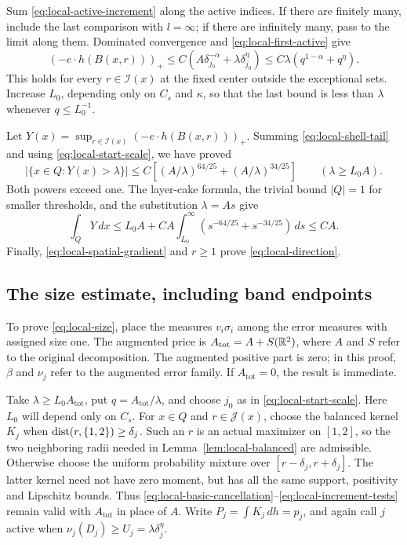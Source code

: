 Sum \eqref{eq:local-active-increment} along the active indices. If
there are finitely many, include the last comparison with $l=\infty$;
if there are infinitely many, pass to the limit along them. Dominated
convergence and \eqref{eq:local-first-active} give
\begin{equation}\label{eq:local-final-projection}
(-e\cdot h(B(x,r)))_+
 \le C\left(A\delta_{j_0}^{-\alpha}
                   +\lambda\delta_{j_0}^\eta\right)
 \le C\lambda\left(q^{1-\alpha}+q^\eta\right).
\end{equation}
This holds for every $r\in\mathcal I(x)$ at the fixed center outside
the exceptional sets. Increase $L_0$, depending only on $C_s$ and
$\kappa$, so that the last bound is less than $\lambda$ whenever
$q\le L_0^{-1}$.

Let $Y(x)=\sup_{r\in\mathcal I(x)}(-e\cdot h(B(x,r)))_+$.
Summing \eqref{eq:local-shell-tail} and using
\eqref{eq:local-start-scale}, we have proved
\begin{equation}\label{eq:local-direction-tail}
|\{x\in Q:Y(x)>\lambda\}|
 \le C\left[
       (A/\lambda)^{64/25}+(A/\lambda)^{34/25}\right]
 \qquad(\lambda\ge L_0A).
\end{equation}
Both powers exceed one. The layer-cake formula, the trivial bound
$|Q|=1$ for smaller thresholds, and the substitution
$\lambda=As$ give
\[
\int_QY\,dx
 \le L_0A+C A\int_{L_0}^{\infty}
                  (s^{-64/25}+s^{-34/25})\,ds\le C A.
\]
Finally, \eqref{eq:local-spatial-gradient} and $r\ge1$ prove
\eqref{eq:local-direction}.

\subsection{The size estimate, including band endpoints}

To prove \eqref{eq:local-size}, place the measures $v_i\sigma_i$
among the error measures with assigned size one. The augmented price is
$A_{\mathrm{tot}}=A+S(\mathbb R^2)$, where $A$ and $S$ refer to the original
decomposition. The augmented positive part is zero; in this proof,
$\beta$ and $\nu_j$ refer to the augmented error family.
If $A_{\mathrm{tot}}=0$, the result is immediate.

Take $\lambda\ge L_0A_{\mathrm{tot}}$, put $q=A_{\mathrm{tot}}/\lambda$, and choose $j_0$ as in
\eqref{eq:local-start-scale}. Here $L_0$ will depend only on $C_s$. For $x\in Q$ and
$r\in\mathcal J(x)$, choose the balanced kernel $K_j$ when
$\operatorname{dist}(r,\{1,2\})\ge\delta_j$. Such an $r$ is an actual
maximizer on $[1,2]$, so the two neighboring radii needed in
Lemma~\ref{lem:local-balanced} are admissible. Otherwise choose the
uniform probability mixture over $[r-\delta_j,r+\delta_j]$.
The latter kernel need not have zero moment, but has all the same
support, positivity and Lipschitz bounds. Thus
\eqref{eq:local-basic-cancellation}--\eqref{eq:local-increment-tests}
remain valid with $A_{\mathrm{tot}}$ in place of $A$. Write $P_j=\int K_j\,dh=p_j$, and again call $j$
active when $\nu_j(D_j)\ge U_j=\lambda\delta_j^\eta$.

